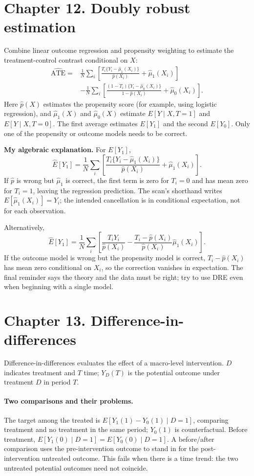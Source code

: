 \section{Chapter 12. Doubly robust estimation}
Combine linear outcome regression and propensity weighting to estimate the treatment-control contrast conditional on $X$:
\begin{align*}
\widehat{\mathrm{ATE}}={}&\frac1N\sum_i\left[\frac{T_i\{Y_i-\hat\mu_1(X_i)\}}{\hat p(X_i)}+\hat\mu_1(X_i)\right]\\
&-\frac1N\sum_i\left[\frac{(1-T_i)\{Y_i-\hat\mu_0(X_i)\}}{1-\hat p(X_i)}+\hat\mu_0(X_i)\right].
\end{align*}
Here $\hat p(X)$ estimates the propensity score (for example, using logistic regression), and $\hat\mu_1(X)$ and $\hat\mu_0(X)$ estimate $E[Y\mid X,T=1]$ and $E[Y\mid X,T=0]$. The first average estimates $E[Y_1]$ and the second $E[Y_0]$. Only one of the propensity or outcome models needs to be correct.

\textbf{My algebraic explanation.} For $E[Y_1]$,
\[\widehat E[Y_1]=\frac1N\sum_i\left[\frac{T_i\{Y_i-\hat\mu_1(X_i)\}}{\hat p(X_i)}+\hat\mu_1(X_i)\right].\]
If $\hat p$ is wrong but $\hat\mu_1$ is correct, the first term is zero for $T_i=0$ and has mean zero for $T_i=1$, leaving the regression prediction. The scan's shorthand writes $E[\hat\mu_1(X_i)]=Y_i$; the intended cancellation is in conditional expectation, not for each observation.

Alternatively,
\[\widehat E[Y_1]=\frac1N\sum_i\left[\frac{T_iY_i}{\hat p(X_i)}-\frac{T_i-\hat p(X_i)}{\hat p(X_i)}\hat\mu_1(X_i)\right].\]
If the outcome model is wrong but the propensity model is correct, $T_i-\hat p(X_i)$ has mean zero conditional on $X_i$, so the correction vanishes in expectation. The final reminder says the theory and the data must be right; try to use DRE even when beginning with a single model.

\section{Chapter 13. Difference-in-differences}
Difference-in-differences evaluates the effect of a macro-level intervention. $D$ indicates treatment and $T$ time; $Y_D(T)$ is the potential outcome under treatment $D$ in period $T$.

\paragraph{Two comparisons and their problems.}
The target among the treated is $E[Y_1(1)-Y_0(1)\mid D=1]$, comparing treatment and no treatment in the same period; $Y_0(1)$ is counterfactual. Before treatment, $E[Y_1(0)\mid D=1]=E[Y_0(0)\mid D=1]$. A before/after comparison uses the pre-intervention outcome to stand in for the post-intervention untreated outcome. This fails when there is a time trend: the two untreated potential outcomes need not coincide.

